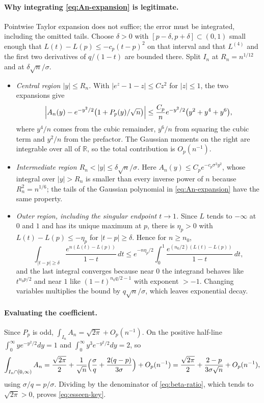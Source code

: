 \documentclass[10pt,a4paper]{article}
\theoremstyle{plain}
\theoremstyle{definition}
\newcommand{\R}{\mathbb{R}}
\newcommand{\bigO}{O}
\begin{document}
\paragraph{Why integrating \eqref{eq:An-expansion} is legitimate.}
Pointwise Taylor expansion does not suffice; the error must be integrated,
including the omitted tails. Choose $\delta>0$ with
$[p-\delta,p+\delta]\subset(0,1)$ small enough that
$L(t)-L(p)\le-c_p(t-p)^2$ on that interval and that $L^{(4)}$ and the first two
derivatives of $q/(1-t)$ are bounded there. Split $I_n$ at $R_n=n^{1/12}$ and
at $\delta\sqrt n/\sigma$.
\begin{itemize}[leftmargin=2.2em]
\item \emph{Central region $|y|\le R_n$.} With $|e^z-1-z|\le Cz^2$ for
  $|z|\le1$, the two expansions give
  \[
    \Bigl|A_n(y)-e^{-y^2/2}\bigl(1+P_p(y)/\sqrt n\bigr)\Bigr|
    \le \frac{C_p}{n}e^{-y^2/2}\bigl(y^2+y^4+y^6\bigr),
  \]
  where $y^4/n$ comes from the cubic remainder, $y^6/n$ from squaring the cubic
  term and $y^2/n$ from the prefactor. The Gaussian moments on the right are
  integrable over all of $\R$, so the total contribution is $\bigO_p(n^{-1})$.
\item \emph{Intermediate region $R_n<|y|\le\delta\sqrt n/\sigma$.} Here
  $A_n(y)\le C_pe^{-c_p\sigma^2y^2}$, whose integral over $|y|>R_n$ is smaller
  than every inverse power of $n$ because $R_n^2=n^{1/6}$; the tails of the
  Gaussian polynomial in \eqref{eq:An-expansion} have the same property.
\item \emph{Outer region, including the singular endpoint $t\to1$.} Since $L$
  tends to $-\infty$ at $0$ and $1$ and has its unique maximum at $p$, there is
  $\eta_p>0$ with $L(t)-L(p)\le-\eta_p$ for $|t-p|\ge\delta$. Hence for
  $n\ge n_0$,
  \[
    \int_{|t-p|\ge\delta}\frac{e^{n(L(t)-L(p))}}{1-t}\,dt
    \le e^{-n\eta_p/2}\int_0^1\frac{e^{(n_0/2)(L(t)-L(p))}}{1-t}\,dt,
  \]
  and the last integral converges because near $0$ the integrand behaves like
  $t^{n_0p/2}$ and near $1$ like $(1-t)^{n_0q/2-1}$ with exponent
  $>-1$. Changing variables multiplies the bound by $q\sqrt n/\sigma$, which
  leaves exponential decay.
\end{itemize}

\paragraph{Evaluating the coefficient.}
Since $P_p$ is odd, $\int_{I_n}A_n = \sqrt{2\pi}+\bigO_p(n^{-1})$. On the
positive half-line $\int_0^\infty ye^{-y^2/2}dy=1$ and
$\int_0^\infty y^3e^{-y^2/2}dy=2$, so
\[
  \int_{I_n\cap[0,\infty)}A_n
  = \frac{\sqrt{2\pi}}{2}
    + \frac1{\sqrt n}\Bigl(\frac{\sigma}{q}+\frac{2(q-p)}{3\sigma}\Bigr)
    + \bigO_p(n^{-1})
  = \frac{\sqrt{2\pi}}{2} + \frac{2-p}{3\sigma\sqrt n} + \bigO_p(n^{-1}),
\]
using $\sigma/q=p/\sigma$. Dividing by the denominator of
\eqref{eq:beta-ratio}, which tends to $\sqrt{2\pi}>0$, proves
\eqref{eq:esseen-key}.
\end{document}
